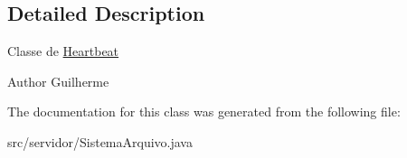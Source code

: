 \subsection{Detailed Description}
Classe de \hyperlink{classservidor_1_1_sistema_arquivo_1_1_heartbeat}{Heartbeat}

\begin{DoxyAuthor}{Author}
Guilherme 
\end{DoxyAuthor}


The documentation for this class was generated from the following file\+:\begin{DoxyCompactItemize}
\item 
src/servidor/Sistema\+Arquivo.\+java\end{DoxyCompactItemize}

